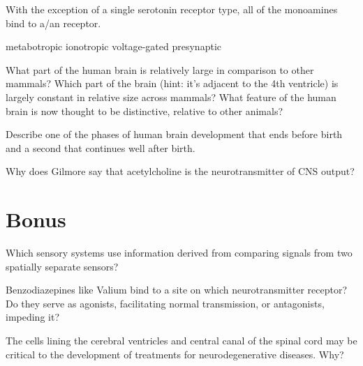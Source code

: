 \documentclass[]{exam}
\begin{document}
\begin{questions}
\question With the exception of a single serotonin receptor type, all of the monoamines bind to a/an \fillin receptor.
\begin{choices}
\choice metabotropic
\choice ionotropic
\choice voltage-gated
\choice presynaptic
\end{choices}

\newpage

\question What part of the human brain is relatively large in comparison to other mammals? Which part of the brain (hint: it's adjacent to the 4th ventricle) is largely constant in relative size across mammals? What feature of the human brain is now thought to be distinctive, relative to other animals?

\vspace{0.75in}

\question Describe one of the phases of human brain development that ends before birth and a second that continues well after birth.

\vspace{0.75in}

\question Why does Gilmore say that acetylcholine is the neurotransmitter of CNS output?

\vspace{0.75in}

\section{Bonus}

\question Which sensory systems use information derived from comparing signals from two spatially separate sensors?

\vspace{0.75in}

\question Benzodiazepines like Valium bind to a site on which neurotransmitter receptor? Do they serve as agonists, facilitating normal transmission, or antagonists, impeding it?

\vspace{0.75in}

\question The cells lining the cerebral ventricles and central canal of the spinal cord may be critical to the development of treatments for neurodegenerative diseases. Why?

\end{questions}
\end{document}
